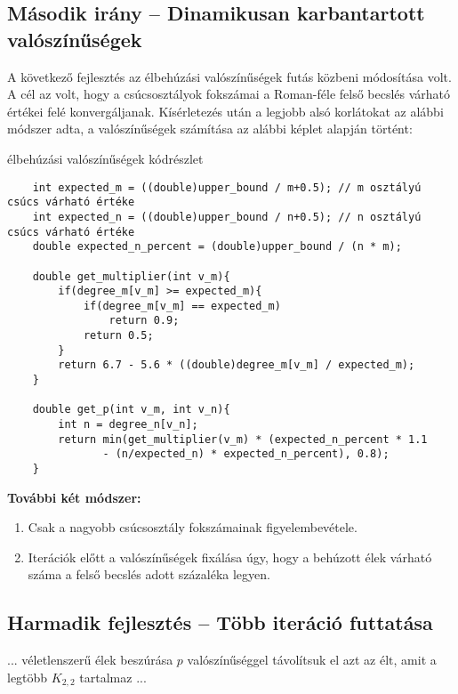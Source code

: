 \documentclass[12pt,a4paper]{article}
\begin{document}
\subsection*{Második irány – Dinamikusan karbantartott valószínűségek}

A következő fejlesztés az élbehúzási valószínűségek futás közbeni módosítása volt. A cél az volt, hogy a csúcsosztályok fokszámai a Roman-féle felső becslés várható értékei felé konvergáljanak. Kísérletezés után a legjobb alsó korlátokat az alábbi módszer adta, a valószínűségek számítása az alábbi képlet alapján történt:

\begin{algorithm}[H]
\caption{élbehúzási valószínűségek kódrészlet}
\begin{verbatim} 
    int expected_m = ((double)upper_bound / m+0.5); // m osztályú csúcs várható értéke
    int expected_n = ((double)upper_bound / n+0.5); // n osztályú csúcs várható értéke
    double expected_n_percent = (double)upper_bound / (n * m);
    
    double get_multiplier(int v_m){
        if(degree_m[v_m] >= expected_m){
            if(degree_m[v_m] == expected_m)
                return 0.9;
            return 0.5;
        }
        return 6.7 - 5.6 * ((double)degree_m[v_m] / expected_m);
    }

    double get_p(int v_m, int v_n){
        int n = degree_n[v_n];
        return min(get_multiplier(v_m) * (expected_n_percent * 1.1
               - (n/expected_n) * expected_n_percent), 0.8);
    }
\end{verbatim}    
\end{algorithm}

\textbf{További két módszer:}
\begin{enumerate}
    \item Csak a nagyobb csúcsosztály fokszámainak figyelembevétele.
    \item Iterációk előtt a valószínűségek fixálása úgy, hogy a behúzott élek várható száma a felső becslés adott százaléka legyen.
\end{enumerate}

\subsection*{Harmadik fejlesztés – Több iteráció futtatása}
\begin{algorithm}
\begin{algorithmic}[1]
    \State ...
        \State véletlenszerű élek beszúrása $p$ valószínűséggel
            \State távolítsuk el azt az $\text{élt}$, amit a legtöbb $K_{2,2}$ tartalmaz
        \EndWhile
    \EndFor
    \State ...
\end{algorithmic}
\end{algorithm}
\end{document}
